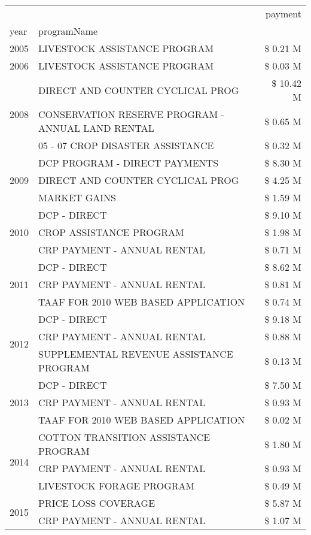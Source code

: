 \begin{tabular}{llr}
\toprule
 &  & payment \\
year & programName &  \\
\midrule
2005 & LIVESTOCK ASSISTANCE PROGRAM & \$ 0.21 M \\
\cline{1-3}
2006 & LIVESTOCK ASSISTANCE PROGRAM & \$ 0.03 M \\
\cline{1-3}
\multirow[t]{3}{*}{2008} & DIRECT AND COUNTER CYCLICAL PROG & \$ 10.42 M \\
 & CONSERVATION RESERVE PROGRAM - ANNUAL LAND RENTAL & \$ 0.65 M \\
 & 05 - 07 CROP DISASTER ASSISTANCE & \$ 0.32 M \\
\cline{1-3}
\multirow[t]{3}{*}{2009} & DCP PROGRAM - DIRECT PAYMENTS & \$ 8.30 M \\
 & DIRECT AND COUNTER CYCLICAL PROG & \$ 4.25 M \\
 & MARKET GAINS & \$ 1.59 M \\
\cline{1-3}
\multirow[t]{3}{*}{2010} & DCP - DIRECT & \$ 9.10 M \\
 & CROP ASSISTANCE PROGRAM & \$ 1.98 M \\
 & CRP PAYMENT - ANNUAL RENTAL & \$ 0.71 M \\
\cline{1-3}
\multirow[t]{3}{*}{2011} & DCP - DIRECT & \$ 8.62 M \\
 & CRP PAYMENT - ANNUAL RENTAL & \$ 0.81 M \\
 & TAAF FOR 2010 WEB BASED APPLICATION & \$ 0.74 M \\
\cline{1-3}
\multirow[t]{3}{*}{2012} & DCP - DIRECT & \$ 9.18 M \\
 & CRP PAYMENT - ANNUAL RENTAL & \$ 0.88 M \\
 & SUPPLEMENTAL REVENUE ASSISTANCE PROGRAM & \$ 0.13 M \\
\cline{1-3}
\multirow[t]{3}{*}{2013} & DCP - DIRECT & \$ 7.50 M \\
 & CRP PAYMENT - ANNUAL RENTAL & \$ 0.93 M \\
 & TAAF FOR 2010 WEB BASED APPLICATION & \$ 0.02 M \\
\cline{1-3}
\multirow[t]{3}{*}{2014} & COTTON TRANSITION ASSISTANCE PROGRAM & \$ 1.80 M \\
 & CRP PAYMENT - ANNUAL RENTAL & \$ 0.93 M \\
 & LIVESTOCK FORAGE PROGRAM & \$ 0.49 M \\
\cline{1-3}
\multirow[t]{3}{*}{2015} & PRICE LOSS COVERAGE & \$ 5.87 M \\
 & CRP PAYMENT - ANNUAL RENTAL & \$ 1.07 M \\

\end{tabular}
